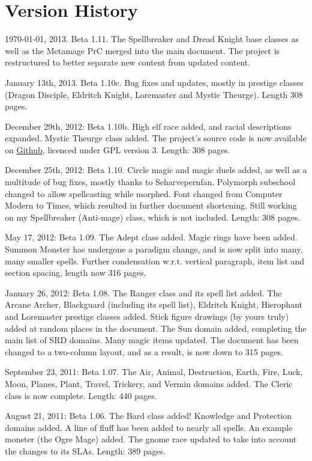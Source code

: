 \section{Version History}
\begin{list}{}{\leftmargin=1em}
 \item \today, 2013. Beta 1.11. The Spellbreaker and Dread Knight base classes as well as the Metamage PrC merged into the main document. The project is restructured to better separate new content from updated content.
 \item January 13th, 2013. Beta 1.10c. Bug fixes and updates, mostly in prestige classes (Dragon Disciple, Eldritch Knight, Loremaster and Mystic Theurge). Length 308 pages.
 \item December 29th, 2012: Beta 1.10b. High elf race added, and racial descriptions expanded. Mystic Theurge class added. The project's source code is now available on \href{https://github.com/Ernir/VancianToPsionics}{Github}, licenced under GPL version 3. Length: 308 pages.
 \item December 25th, 2012: Beta 1.10. Circle magic and magic duels added, as well as a multitude of bug fixes, mostly thanks to Seharvepernfan. Polymorph subschool changed to allow spellcasting while morphed. Font changed from Computer Modern to Times, which resulted in further document shortening. Still working on my Spellbreaker (Anti-mage) class, which is not included. Length: 308 pages.
 \item May 17, 2012: Beta 1.09. The Adept class added. Magic rings have been added. Summon Monster has undergone a paradigm change, and is now split into many, many smaller spells. Further condensation w.r.t. vertical paragraph, item list and section spacing, length now 316 pages.
 \item January 26, 2012: Beta 1.08. The Ranger class and its spell list added. The Arcane Archer, Blackguard (including its spell list), Eldritch Knight, Hierophant and Loremaster prestige classes added. Stick figure drawings (by yours truly) added at random places in the document. The Sun domain added, completing the main list of SRD domains. Many magic items updated. The document has been changed to a two-column layout, and as a result, is now down to 315 pages.
 \item September 23, 2011: Beta 1.07. The Air, Animal, Destruction, Earth, Fire, Luck, Moon, Planes, Plant, Travel, Trickery, and Vermin domains added. The Cleric class is now complete. Length: 440 pages.
 \item August 21, 2011: Beta 1.06. The Bard class added! Knowledge and Protection domains added. A line of fluff has been added to nearly all spells. An example monster (the Ogre Mage) added. The gnome race updated to take into account the changes to its SLAs. Length: 389 pages.

\end{list}

